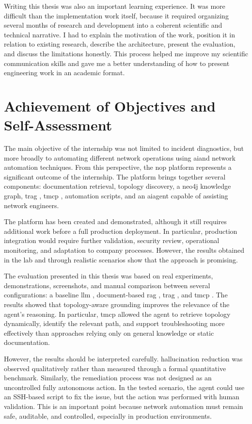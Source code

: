 \documentclass[11pt,a4paper]{report}
\begin{document}
Writing this thesis was also an important learning experience. It was more difficult than the implementation work itself, because it required organizing several months of research and development into a coherent scientific and technical narrative. I had to explain the motivation of the work, position it in relation to existing research, describe the architecture, present the evaluation, and discuss the limitations honestly. This process helped me improve my scientific communication skills and gave me a better understanding of how to present engineering work in an academic format.

\section*{Achievement of Objectives and Self-Assessment}

The main objective of the internship was not limited to incident diagnostics, but more broadly to automating different network operations using \gls{ai}and network automation techniques. From this perspective, the  \gls{nop}  platform represents a significant outcome of the internship. The platform brings together several components: documentation retrieval, topology discovery, a  \gls{neo4j}  knowledge graph,  \gls{trag} ,  \gls{tmcp} , automation scripts, and an \gls{ai}agent capable of assisting network engineers.

The platform has been created and demonstrated, although it still requires additional work before a full production deployment. In particular, production integration would require further validation, security review, operational monitoring, and adaptation to company processes. However, the results obtained in the lab and through realistic scenarios show that the approach is promising.

The evaluation presented in this thesis was based on real experiments, demonstrations, screenshots, and manual comparison between several configurations: a baseline \gls{llm} , document-based  \gls{rag} ,  \gls{trag} , and  \gls{tmcp} . The results showed that topology-aware \gls{grounding} improves the relevance of the agent's reasoning. In particular,  \gls{tmcp}  allowed the agent to retrieve topology dynamically, identify the relevant path, and support troubleshooting more effectively than approaches relying only on general knowledge or static documentation.

However, the results should be interpreted carefully. \gls{hallucination} reduction was observed qualitatively rather than measured through a formal quantitative benchmark. Similarly, the remediation process was not designed as an uncontrolled fully autonomous action. In the tested scenario, the agent could use an SSH-based script to fix the issue, but the action was performed with human validation. This is an important point because network automation must remain safe, auditable, and controlled, especially in production environments.
\end{document}
